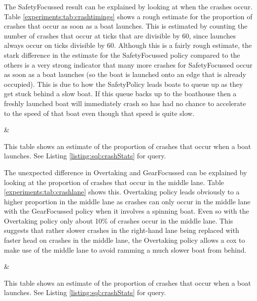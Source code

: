   The SafetyFocussed result can be explained by looking at when the crashes occur. Table \ref{experiments:tab:crashtimings} shows a rough estimate for the proportion of crashes that occur as soon as a boat launches. This is estimated by counting the number of crashes that occur at ticks that are divisible by 60, since launches always occur on ticks divisible by 60. Although this is a fairly rough estimate, the stark difference in the estimate for the SafetyFocussed policy compared to the others is a very strong indicator that many more crashes for SafetyFocussed occur as soon as a boat launches (so the boat is launched onto an edge that is already occupied). This is due to how the SafetyPolicy leads boats to queue up as they get stuck behind a slow boat. If this queue backs up to the boathouse then a freshly launched boat will immediately crash so has had no chance to accelerate to the speed of that boat even though that speed is quite slow.

  \begin{table}[h]
  \centering
  {\cp & \crashes }
  \caption{This table shows an estimate of the proportion of crashes that occur when a boat launches. See Listing \ref{listing:sql:crashStats} for query.}
  \label{experiments:tab:crashtimings}
  \end{table}
  
  The unexpected difference in Overtaking and GearFocussed can be explained by looking at the proportion of crashes that occur in the middle lane. Table \ref{experiments:tab:crashlane} shows this. Overtaking policy leads obviously to a higher proportion in the middle lane as crashes can only occur in the middle lane with the GearFocussed policy when it involves a spinning boat. Even so with the Overtaking policy only about 10\% of crashes occur in the middle lane. This suggests that rather slower crashes in the right-hand lane being replaced with faster head on crashes in the middle lane, the Overtaking policy allows a cox to make use of the middle lane to avoid ramming a much slower boat from behind.
  
  \begin{table}[h]
  \centering
  {\cp & \middle }
  \caption{This table shows an estimate of the proportion of crashes that occur when a boat launches. See Listing \ref{listing:sql:crashStats} for query.}
  \label{experiments:tab:crashlane}
  \end{table}
  
